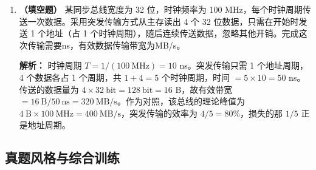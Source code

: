 \begin{enumerate}
\ifshowsolutions\par\noindent\textbf{解析：} 三种握手按「谁等谁」区分：不互锁——主设备发完请求，过一段时间就认为传输完成并撤销请求，从设备也不管请求是否还在；半互锁——主设备等从设备的应答后才撤销请求，但从设备发完应答就撤销，不等请求撤销；全互锁——双方互相等待，请求的撤销等应答，应答的撤销等请求撤销，共四次信号变化，最可靠也最慢。题干两句话都是「等对方」，故为全互锁。同步方式根本不用握手信号，靠统一时钟定节拍，不是握手。\else \answerarea \fi

\item \textbf{（填空题）} 某同步总线宽度为 32 位，时钟频率为 100 MHz，每个时钟周期传送一次数据。采用突发传输方式从主存读出 4 个 32 位数据，只需在开始时发送 1 个地址（占 1 个时钟周期），随后连续传送数据，忽略其他开销。完成这次传输需要\underline{\hspace{2cm}}ns，有效数据传输带宽为\underline{\hspace{2cm}}MB/s。

\ifshowsolutions\par\noindent\textbf{解析：} 时钟周期 $T=1/(100\ \text{MHz})=10$ ns。突发传输只需 1 个地址周期，4 个数据各占 1 个周期，共 $1+4=5$ 个时钟周期，时间 $=5\times10=50$ ns。传送的数据量为 $4\times32\ \text{bit}=128\ \text{bit}=16$ B，故有效带宽 $=16\ \text{B}/50\ \text{ns}=320\ \text{MB/s}$。作为对照，该总线的理论峰值为 $4\ \text{B}\times100\ \text{MHz}=400\ \text{MB/s}$，突发传输的效率为 $4/5=80\%$，损失的那 $1/5$ 正是地址周期。\else \answerarea \fi

\end{enumerate}

\subsection{真题风格与综合训练}

